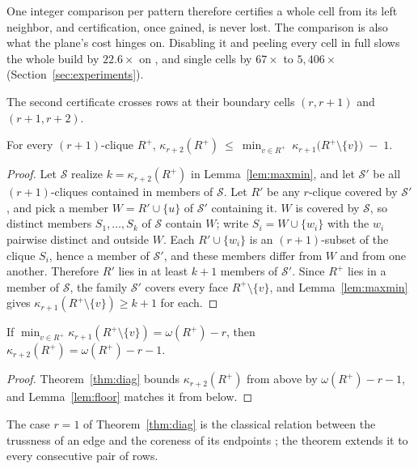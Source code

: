 One integer comparison per pattern therefore certifies a whole cell from its left neighbor, and certification, once gained, is never lost.
%
The comparison is also what the plane's cost hinges on.
%
Disabling it and peeling every cell in full slows the whole build by $22.6\times$ on \nasasrb, and single cells by $67\times$ to $5{,}406\times$ (Section~\ref{sec:experiments}).

The second certificate crosses rows at their boundary cells $(r,r+1)$ and $(r+1,r+2)$.

\begin{theorem}\label{thm:diag}
For every $(r{+}1)$-clique $R^{+}$,
$\kappa_{r+2}(R^{+})\ \le\ \min_{v\in R^{+}}\ \kappa_{r+1}\bigl(R^{+}\setminus\{v\}\bigr)\;-\;1$.
\end{theorem}

\begin{proof}
Let $\mathcal{S}$ realize $k=\kappa_{r+2}(R^{+})$ in Lemma~\ref{lem:maxmin}, and let $\mathcal{S}'$ be all $(r{+}1)$-cliques contained in members of $\mathcal{S}$.
%
Let $R'$ be any $r$-clique covered by $\mathcal{S}'$, and pick a member $W=R'\cup\{u\}$ of $\mathcal{S}'$ containing it.
%
$W$ is covered by $\mathcal{S}$, so distinct members $S_1,\dots,S_k$ of $\mathcal{S}$ contain $W$; write $S_i=W\cup\{w_i\}$ with the $w_i$ pairwise distinct and outside $W$.
%
Each $R'\cup\{w_i\}$ is an $(r{+}1)$-subset of the clique $S_i$, hence a member of $\mathcal{S}'$, and these members differ from $W$ and from one another.
%
Therefore $R'$ lies in at least $k+1$ members of $\mathcal{S}'$.
%
Since $R^{+}$ lies in a member of $\mathcal{S}$, the family $\mathcal{S}'$ covers every face $R^{+}\setminus\{v\}$, and Lemma~\ref{lem:maxmin} gives $\kappa_{r+1}(R^{+}\setminus\{v\})\ge k+1$ for each.
\end{proof}

\begin{corollary}\label{cor:diag}
If $\min_{v\in R^{+}}\kappa_{r+1}(R^{+}\setminus\{v\})=\omega(R^{+})-r$, then $\kappa_{r+2}(R^{+})=\omega(R^{+})-r-1$.
\end{corollary}

\begin{proof}
Theorem~\ref{thm:diag} bounds $\kappa_{r+2}(R^{+})$ from above by $\omega(R^{+})-r-1$, and Lemma~\ref{lem:floor} matches it from below.
\end{proof}

\begin{remark}
The case $r=1$ of Theorem~\ref{thm:diag} is the classical relation between the trussness of an edge and the coreness of its endpoints \cite{cohen2008trusses,huang2014truss}; the theorem extends it to every consecutive pair of rows.
\end{remark}

